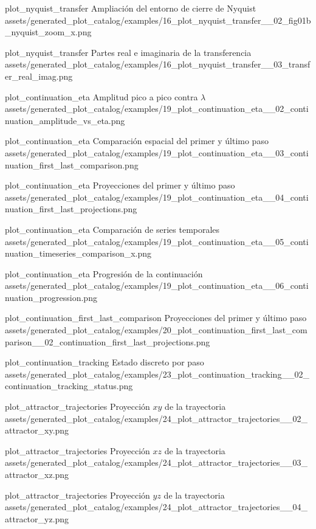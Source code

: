 \plotcatalogextra
  {plot_nyquist_transfer}
  {Ampliación del entorno de cierre de Nyquist}
  {assets/generated_plot_catalog/examples/16_plot_nyquist_transfer__02_fig01b_nyquist_zoom_x.png}

\plotcatalogextra
  {plot_nyquist_transfer}
  {Partes real e imaginaria de la transferencia}
  {assets/generated_plot_catalog/examples/16_plot_nyquist_transfer__03_transfer_real_imag.png}

\plotcatalogextra
  {plot_continuation_eta}
  {Amplitud pico a pico contra \(\lambda\)}
  {assets/generated_plot_catalog/examples/19_plot_continuation_eta__02_continuation_amplitude_vs_eta.png}

\plotcatalogextra
  {plot_continuation_eta}
  {Comparación espacial del primer y último paso}
  {assets/generated_plot_catalog/examples/19_plot_continuation_eta__03_continuation_first_last_comparison.png}

\plotcatalogextra
  {plot_continuation_eta}
  {Proyecciones del primer y último paso}
  {assets/generated_plot_catalog/examples/19_plot_continuation_eta__04_continuation_first_last_projections.png}

\plotcatalogextra
  {plot_continuation_eta}
  {Comparación de series temporales}
  {assets/generated_plot_catalog/examples/19_plot_continuation_eta__05_continuation_timeseries_comparison_x.png}

\plotcatalogextra
  {plot_continuation_eta}
  {Progresión de la continuación}
  {assets/generated_plot_catalog/examples/19_plot_continuation_eta__06_continuation_progression.png}

\plotcatalogextra
  {plot_continuation_first_last_comparison}
  {Proyecciones del primer y último paso}
  {assets/generated_plot_catalog/examples/20_plot_continuation_first_last_comparison__02_continuation_first_last_projections.png}

\plotcatalogextra
  {plot_continuation_tracking}
  {Estado discreto por paso}
  {assets/generated_plot_catalog/examples/23_plot_continuation_tracking__02_continuation_tracking_status.png}

\plotcatalogextra
  {plot_attractor_trajectories}
  {Proyección \(xy\) de la trayectoria}
  {assets/generated_plot_catalog/examples/24_plot_attractor_trajectories__02_attractor_xy.png}

\plotcatalogextra
  {plot_attractor_trajectories}
  {Proyección \(xz\) de la trayectoria}
  {assets/generated_plot_catalog/examples/24_plot_attractor_trajectories__03_attractor_xz.png}

\plotcatalogextra
  {plot_attractor_trajectories}
  {Proyección \(yz\) de la trayectoria}
  {assets/generated_plot_catalog/examples/24_plot_attractor_trajectories__04_attractor_yz.png}

